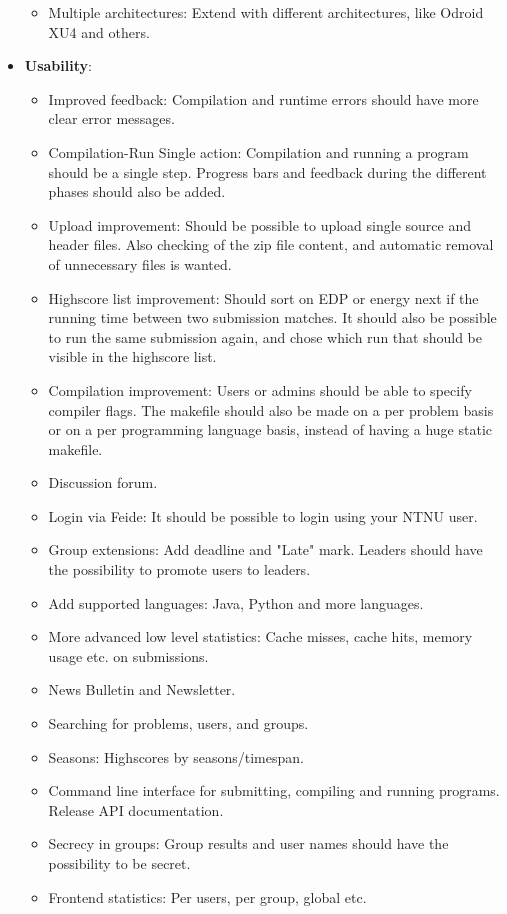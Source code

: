 \begin{itemize}
\begin{itemize}
        \item Multiple architectures: Extend with different architectures, like Odroid XU4 and others.
    \end{itemize}
\item \textbf{Usability}:
    \begin{itemize}
        \item Improved feedback: Compilation and runtime errors should have more clear error messages.
        \item Compilation-Run Single action: Compilation and running a program should be a single step. Progress bars and feedback during the different phases should also be added.
        \item Upload improvement: Should be possible to upload single source and header files. Also checking of the zip file content, and automatic removal of unnecessary files is wanted.
        \item Highscore list improvement: Should sort on EDP or energy next if the running time between two submission matches. It should also be possible to run the same submission again, and chose which run that should be visible in the highscore list.
        \item Compilation improvement: Users or admins should be able to specify compiler flags. The makefile should also be made on a per problem basis or on a per programming language basis, instead of having a huge static makefile.
        \item Discussion forum.
        \item Login via Feide: It should be possible to login using your NTNU user.
        \item Group extensions: Add deadline and "Late" mark. Leaders should have the possibility to promote users to leaders.
        \item Add supported languages: Java, Python and more languages.
        \item More advanced low level statistics: Cache misses, cache hits, memory usage etc. on submissions.
        \item News Bulletin and Newsletter.
        \item Searching for problems, users, and groups.
        \item Seasons: Highscores by seasons/timespan.
        \item Command line interface for submitting, compiling and running programs. Release API documentation.
        \item Secrecy in groups: Group results and user names should have the possibility to be secret.
        \item Frontend statistics: Per users, per group, global etc.
    \end{itemize}
\end{itemize}

